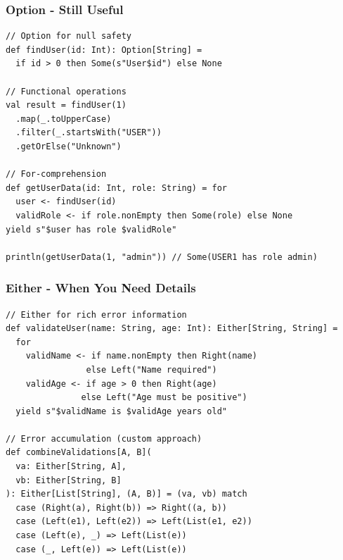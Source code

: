 \documentclass{beamer}
\begin{document}
\begin{frame}[fragile]
\frametitle{Option - Still Useful}

\begin{lstlisting}[style=scalaStyle]
// Option for null safety
def findUser(id: Int): Option[String] = 
  if id > 0 then Some(s"User$id") else None

// Functional operations
val result = findUser(1)
  .map(_.toUpperCase)
  .filter(_.startsWith("USER"))
  .getOrElse("Unknown")

// For-comprehension
def getUserData(id: Int, role: String) = for
  user <- findUser(id)
  validRole <- if role.nonEmpty then Some(role) else None
yield s"$user has role $validRole"

println(getUserData(1, "admin")) // Some(USER1 has role admin)
\end{lstlisting}

\end{frame}

\begin{frame}[fragile]
\frametitle{Either - When You Need Details}

\begin{lstlisting}[style=scalaStyle]
// Either for rich error information
def validateUser(name: String, age: Int): Either[String, String] = 
  for
    validName <- if name.nonEmpty then Right(name) 
                else Left("Name required")
    validAge <- if age > 0 then Right(age) 
               else Left("Age must be positive")
  yield s"$validName is $validAge years old"

// Error accumulation (custom approach)
def combineValidations[A, B](
  va: Either[String, A], 
  vb: Either[String, B]
): Either[List[String], (A, B)] = (va, vb) match
  case (Right(a), Right(b)) => Right((a, b))
  case (Left(e1), Left(e2)) => Left(List(e1, e2))
  case (Left(e), _) => Left(List(e))
  case (_, Left(e)) => Left(List(e))
\end{lstlisting}

\end{frame}
\end{document}

